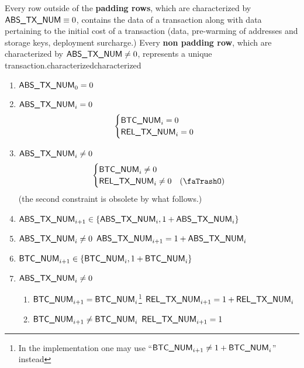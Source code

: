 Every row outside of the \textbf{padding rows}, which are characterized by $\textsf{ABS\_TX\_NUM} \equiv 0$, contains the data of a transaction along with data pertaining to the initial cost of a transaction (data, pre-warming of addresses and storage keys, deployment surcharge.) Every \textbf{non padding row}, which are characterized by $\textsf{ABS\_TX\_NUM} \neq 0$, represents a unique transaction.characterizedcharacterized
\begin{enumerate}
	\item $\textsf{ABS\_TX\_NUM}_{0} = 0$
	\item \If $\textsf{ABS\_TX\_NUM}_{i} = 0$ \Then
	\[
	\begin{cases}
		\textsf{BTC\_NUM}_{i} = 0 \\
		\textsf{REL\_TX\_NUM}_{i} = 0 \\
	\end{cases}
	\]
	\item \If $\textsf{ABS\_TX\_NUM}_{i} \neq 0$ \Then
	\[
	\begin{cases}
		\batchNum_{i} 	\neq 0 \\
		\txNum_{i} 		\neq 0 & (\trash) \\
	\end{cases}
	\]
	(the second constraint is obsolete by what follows.)
	\item $\textsf{ABS\_TX\_NUM}_{i + 1} \in \{ \textsf{ABS\_TX\_NUM}_{i}, 1 + \textsf{ABS\_TX\_NUM}_{i} \}$
	\item \If $\textsf{ABS\_TX\_NUM}_{i} \neq 0$ \Then $\textsf{ABS\_TX\_NUM}_{i + 1} = 1 + \textsf{ABS\_TX\_NUM}_{i}$
	\item $\textsf{BTC\_NUM}_{i + 1} \in \{ \textsf{BTC\_NUM}_{i}, 1 + \textsf{BTC\_NUM}_{i} \}$
	\item \If $\textsf{ABS\_TX\_NUM}_{i} \neq 0$ \Then
	\begin{enumerate}
		\item \If $\textsf{BTC\_NUM}_{i + 1} = \textsf{BTC\_NUM}_{i}$\footnote{In the implementation one may use ``\If $\textsf{BTC\_NUM}_{i + 1} \neq 1 + \textsf{BTC\_NUM}_{i}$'' instead} \Then $\textsf{REL\_TX\_NUM}_{i + 1} = 1 + \textsf{REL\_TX\_NUM}_{i}$
		\item \If $\textsf{BTC\_NUM}_{i + 1} \neq \textsf{BTC\_NUM}_{i}$ \Then $\textsf{REL\_TX\_NUM}_{i + 1} = 1$
	\end{enumerate}
\end{enumerate}
\fi
